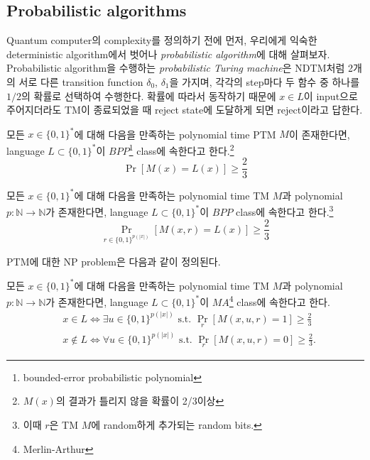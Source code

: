 \subsection{Probabilistic algorithms}
Quantum computer의 complexity를 정의하기 전에 먼저, 우리에게 익숙한 deterministic algorithm에서 벗어나 \textit{probabilistic algorithm}에 대해 살펴보자. Probabilistic algorithm을 수행하는 \textit{probabilistic Turing machine}은 NDTM처럼 2개의 서로 다른 transition function $\delta_0$, $\delta_1$을 가지며, 각각의 step마다 두 함수 중 하나를 $1/2$의 확률로 선택하여 수행한다. 확률에 따라서 동작하기 때문에 $x \in L$이 input으로 주어지더라도 TM이 종료되었을 때 reject state에 도달하게 되면 reject이라고 답한다.
\begin{definition}\label{def:BPP}
    모든 $x \in \{0, 1\}^*$에 대해 다음을 만족하는 polynomial time PTM $M$이 존재한다면, language $L \subset \{0, 1\}^*$이 $BPP$\footnote{bounded-error probabilistic polynomial} class에 속한다고 한다.\footnote{$M(x)$의 결과가 틀리지 않을 확률이 2/3이상}
    \begin{equation*}
        \operatorname{Pr}[M(x)=L(x)] \geq \frac{2}{3}
    \end{equation*}
\end{definition}
\begin{definition}\label{def:BPP-alt}
    모든 $x \in \{0, 1\}^*$에 대해 다음을 만족하는 polynomial time TM $M$과 polynomial $p: \mathbb N \rightarrow \mathbb N$가 존재한다면, language $L \subset \{0, 1\}^*$이 $BPP$ class에 속한다고 한다.\footnote{이때 $r$은 TM $M$에 random하게 추가되는 random bits.}
    \begin{equation*}
        \operatorname{Pr}_{r \in \{0, 1\}^{p(|x|)}}[M(x, r)=L(x)] \geq \frac{2}{3}
    \end{equation*}
\end{definition}
PTM에 대한 NP problem은 다음과 같이 정의된다.
\begin{definition}\label{def:MA}
    모든 $x \in \{0, 1\}^*$에 대해 다음을 만족하는 polynomial time TM $M$과 polynomial $p: \mathbb N \rightarrow \mathbb N$가 존재한다면, language $L \subset \{0, 1\}^*$이 $MA$\footnote{Merlin-Arthur} class에 속한다고 한다.
    $$ 
    \begin{aligned}
        & x \in L \Longleftrightarrow \exists u \in\{0,1\}^{p(|x|)} \text { s.t. } \operatorname{Pr}_r[M(x, u, r)=1] \geq \frac{2}{3} \\
        & x \notin L \Longleftrightarrow \forall u \in\{0,1\}^{p(|x|)} \text { s.t. } \operatorname{Pr}_r[M(x, u, r)=0] \geq \frac{2}{3} .
    \end{aligned}
    $$
\end{definition}
\vspace{-0.5em}
